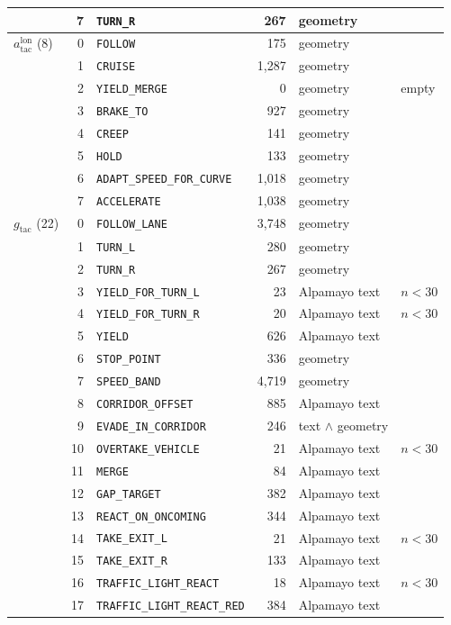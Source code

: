 \begin{center}
\begin{longtable}{@{}p{2.6cm}rp{6.3cm}rp{2.6cm}p{1.2cm}@{}}
 & 7 & \texttt{TURN\_R} & 267 & geometry &  \\
\midrule
$a_{\text{tac}}^{\text{lon}}$ (8) & 0 & \texttt{FOLLOW} & 175 & geometry &  \\
 & 1 & \texttt{CRUISE} & 1,287 & geometry &  \\
 & 2 & \texttt{YIELD\_MERGE} & 0 & geometry & empty \\
 & 3 & \texttt{BRAKE\_TO} & 927 & geometry &  \\
 & 4 & \texttt{CREEP} & 141 & geometry &  \\
 & 5 & \texttt{HOLD} & 133 & geometry &  \\
 & 6 & \texttt{ADAPT\_SPEED\_FOR\_CURVE} & 1,018 & geometry &  \\
 & 7 & \texttt{ACCELERATE} & 1,038 & geometry &  \\
\midrule
$g_{\text{tac}}$ (22) & 0 & \texttt{FOLLOW\_LANE} & 3,748 & geometry &  \\
 & 1 & \texttt{TURN\_L} & 280 & geometry &  \\
 & 2 & \texttt{TURN\_R} & 267 & geometry &  \\
 & 3 & \texttt{YIELD\_FOR\_TURN\_L} & 23 & Alpamayo text & $n<30$ \\
 & 4 & \texttt{YIELD\_FOR\_TURN\_R} & 20 & Alpamayo text & $n<30$ \\
 & 5 & \texttt{YIELD} & 626 & Alpamayo text &  \\
 & 6 & \texttt{STOP\_POINT} & 336 & geometry &  \\
 & 7 & \texttt{SPEED\_BAND} & 4,719 & geometry &  \\
 & 8 & \texttt{CORRIDOR\_OFFSET} & 885 & Alpamayo text &  \\
 & 9 & \texttt{EVADE\_IN\_CORRIDOR} & 246 & text $\wedge$ geometry &  \\
 & 10 & \texttt{OVERTAKE\_VEHICLE} & 21 & Alpamayo text & $n<30$ \\
 & 11 & \texttt{MERGE} & 84 & Alpamayo text &  \\
 & 12 & \texttt{GAP\_TARGET} & 382 & Alpamayo text &  \\
 & 13 & \texttt{REACT\_ON\_ONCOMING} & 344 & Alpamayo text &  \\
 & 14 & \texttt{TAKE\_EXIT\_L} & 21 & Alpamayo text & $n<30$ \\
 & 15 & \texttt{TAKE\_EXIT\_R} & 133 & Alpamayo text &  \\
 & 16 & \texttt{TRAFFIC\_LIGHT\_REACT} & 18 & Alpamayo text & $n<30$ \\
 & 17 & \texttt{TRAFFIC\_LIGHT\_REACT\_RED} & 384 & Alpamayo text &  \\

\end{longtable}
\end{center}
